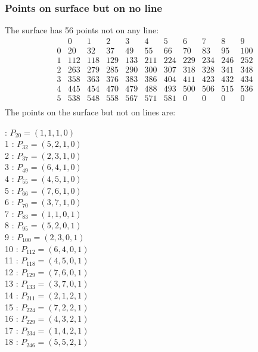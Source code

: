 \documentclass{article}
\begin{document}
{\subsubsection*{Points on surface but on no line}
The surface has 56 points not on any line:\\
$$
\begin{array}{r|*{10}{r}}
 & 0 & 1 & 2 & 3 & 4 & 5 & 6 & 7 & 8 & 9\\
\hline
0 & 20 & 32 & 37 & 49 & 55 & 66 & 70 & 83 & 95 & 100\\
1 & 112 & 118 & 129 & 133 & 211 & 224 & 229 & 234 & 246 & 252\\
2 & 263 & 279 & 285 & 290 & 300 & 307 & 318 & 328 & 341 & 348\\
3 & 358 & 363 & 376 & 383 & 386 & 404 & 411 & 423 & 432 & 434\\
4 & 445 & 454 & 470 & 479 & 488 & 493 & 500 & 506 & 515 & 536\\
5 & 538 & 548 & 558 & 567 & 571 & 581 & 0 & 0 & 0 & 0\\
\end{array}
$$
The points on the surface but not on lines are:\\
\begin{multicols}{2}
 : $P_{20}=( 1, 1, 1, 0 )$\\
1 : $P_{32}=( 5, 2, 1, 0 )$\\
2 : $P_{37}=( 2, 3, 1, 0 )$\\
3 : $P_{49}=( 6, 4, 1, 0 )$\\
4 : $P_{55}=( 4, 5, 1, 0 )$\\
5 : $P_{66}=( 7, 6, 1, 0 )$\\
6 : $P_{70}=( 3, 7, 1, 0 )$\\
7 : $P_{83}=( 1, 1, 0, 1 )$\\
8 : $P_{95}=( 5, 2, 0, 1 )$\\
9 : $P_{100}=( 2, 3, 0, 1 )$\\
10 : $P_{112}=( 6, 4, 0, 1 )$\\
11 : $P_{118}=( 4, 5, 0, 1 )$\\
12 : $P_{129}=( 7, 6, 0, 1 )$\\
13 : $P_{133}=( 3, 7, 0, 1 )$\\
14 : $P_{211}=( 2, 1, 2, 1 )$\\
15 : $P_{224}=( 7, 2, 2, 1 )$\\
16 : $P_{229}=( 4, 3, 2, 1 )$\\
17 : $P_{234}=( 1, 4, 2, 1 )$\\
18 : $P_{246}=( 5, 5, 2, 1 )$\\

\end{multicols}}
\end{document}

